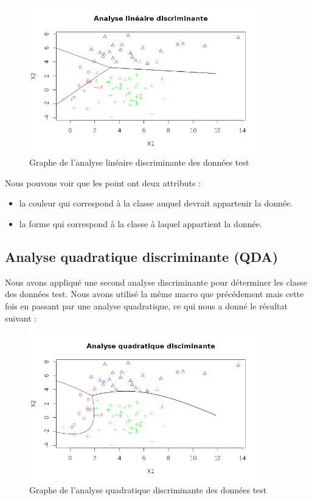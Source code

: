 \documentclass[a4paper,11pt]{article}
\begin{document}
  \begin{figure}[h]
   \center
   \includegraphics[width=10cm]{lineaire_discri.png}
   \caption{Graphe de l'analyse linéaire discriminante des données test}
  \end{figure}
  
  Nous pouvons voir que les point ont deux attributs :
  \begin{itemize}
   \item la couleur qui correspond à la classe auquel devrait appartenir la donnée.
   \item la forme qui correspond à la classe à laquel appartient la donnée.
  \end{itemize}
  
  \subsection{Analyse quadratique discriminante (QDA)}
  
  Nous avons appliqué une second analyse discriminante pour déterminer les classe des données test.
  Nous avons utilisé la même macro que précédement mais cette fois en passant par une analyse quadratique, 
  ce qui nous a donné le résultat suivant :\\
  
  \begin{figure}[h]
   \center
   \includegraphics[width=10cm]{quadratique.png}
   \caption{Graphe de l'analyse quadratique discriminante des données test}
  \end{figure}
  
\end{document}
